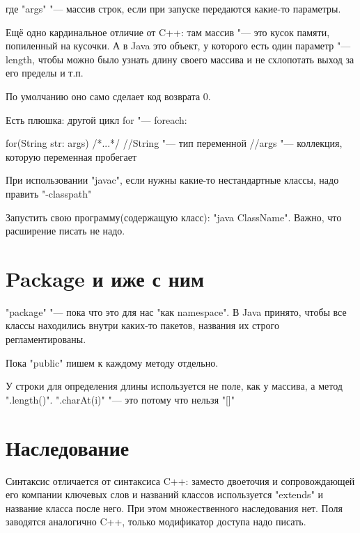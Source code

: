 где \java"args" "--- массив строк, 
если при запуске передаются какие-то параметры.

Ещё одно кардинальное отличие от C++: там массив "--- это кусок памяти, 
попиленный на кусочки. 
А в Java это объект, у которого есть один параметр "---
length, чтобы можно было узнать длину своего массива 
и не схлопотать выход за его пределы и т.п.

По умолчанию оно само сделает код возврата 0.

Есть плюшка: другой цикл for "--- foreach:
\begin{javacode}
	for(String str: args) {
		/*...*/
	}
//String "--- тип переменной
//args "--- коллекция, которую переменная пробегает
\end{javacode}

При использовании \java"javac", 
если нужны какие-то нестандартные классы,
надо править \java"-classpath"

Запустить свою программу(содержащую класс):
\java"java ClassName". Важно, что расширение писать не надо.





\section{Package и иже с ним}

\java"package" "--- пока что это для нас "как namespace". 
В Java принято, чтобы все классы находились внутри каких-то пакетов, 
названия их строго регламентированы.

Пока \java"public" пишем к каждому методу отдельно.

У строки для определения длины используется не поле, как у массива, 
а метод \java".length()".
\java".charAt(i)" "--- это потому что нельзя \java"[]"





\section{Наследование}
Синтаксис отличается
от синтаксиса C++: заместо двоеточия и сопровождающей его компании
ключевых слов и названий классов используется \java"extends"
и название класса после него. 
При этом множественного наследования нет. 
Поля заводятся аналогично C++, только модификатор доступа надо писать.


